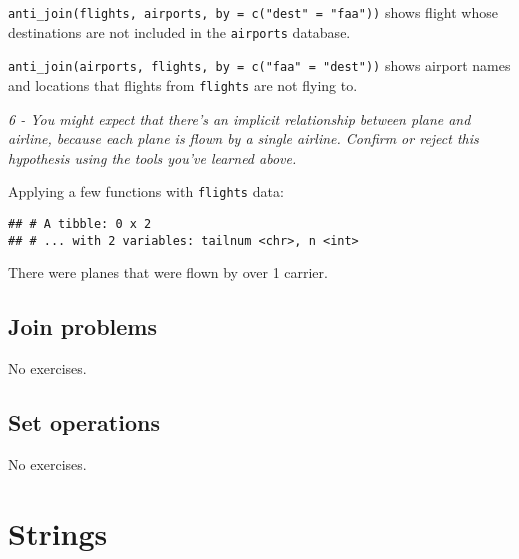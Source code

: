 \documentclass[]{article}
\newenvironment{Shaded}{\begin{snugshade}}{\end{snugshade}}
\newcommand{\KeywordTok}[1]{\textcolor[rgb]{0.13,0.29,0.53}{\textbf{#1}}}
\newcommand{\DataTypeTok}[1]{\textcolor[rgb]{0.13,0.29,0.53}{#1}}
\newcommand{\DecValTok}[1]{\textcolor[rgb]{0.00,0.00,0.81}{#1}}
\newcommand{\StringTok}[1]{\textcolor[rgb]{0.31,0.60,0.02}{#1}}
\newcommand{\OperatorTok}[1]{\textcolor[rgb]{0.81,0.36,0.00}{\textbf{#1}}}
\newcommand{\NormalTok}[1]{#1}
\theoremstyle{definition}
\theoremstyle{definition}
\theoremstyle{definition}
\theoremstyle{remark}
\begin{document}
\texttt{anti\_join(flights,\ airports,\ by\ =\ c("dest"\ =\ "faa"))}
shows flight whose destinations are not included in the
\texttt{airports} database.

\texttt{anti\_join(airports,\ flights,\ by\ =\ c("faa"\ =\ "dest"))}
shows airport names and locations that flights from \texttt{flights} are
not flying to.

\emph{6 - You might expect that there's an implicit relationship between
plane and airline, because each plane is flown by a single airline.
Confirm or reject this hypothesis using the tools you've learned above.}

Applying a few functions with \texttt{flights} data:

\begin{Shaded}
\end{Shaded}

\begin{verbatim}
## # A tibble: 0 x 2
## # ... with 2 variables: tailnum <chr>, n <int>
\end{verbatim}

There were planes that were flown by over 1 carrier.

\subsection{Join problems}\label{join-problems}

No exercises.

\subsection{Set operations}\label{set-operations}

No exercises.

\section{Strings}\label{strings}
\end{document}
